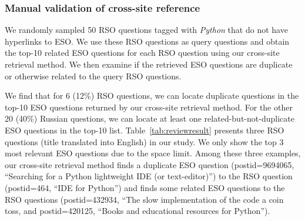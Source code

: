 \subsubsection{Manual validation of cross-site reference}
We randomly sampled 50 RSO questions tagged with \textit{Python} that do not have hyperlinks to ESO. 
We use these RSO questions as query questions and obtain the top-10 related ESO questions for each RSO question using our cross-site retrieval method.
We then examine if the retrieved ESO questions are duplicate or otherwise related to the query RSO questions.  
 
We find that for 6 (12\%) RSO questions, we can locate duplicate questions in the top-10 ESO questions returned by our cross-site retrieval method. 
For the other 20 (40\%) Russian questions, we can locate at least one related-but-not-duplicate ESO questions in the top-10 list. 
Table~\ref{tab:reviewresult} presents three RSO questions (title translated into English) in our study.
We only show the top 3 most relevant ESO questions due to the space limit. 
Among these three examples, our cross-site retrieval method finds a duplicate ESO question (postid=9694065,  ``Searching for a Python lightweight IDE (or text-editor)'') to the RSO question (postid=464, ``IDE for Python'') and finds some related ESO questions to the RSO questions (postid=432934, ``The slow implementation of the code a coin toss, and postid=420125, ``Books and educational resources for Python'').

